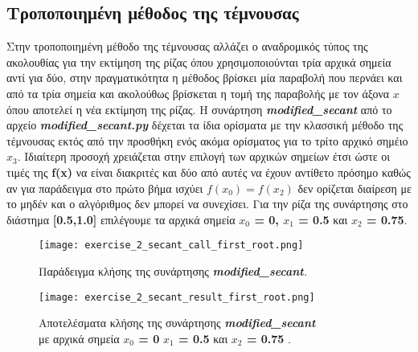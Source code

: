 \documentclass[First Project.tex]{subfiles}
\begin{document}
\subsection{ Τροποποιημένη μέθοδος της τέμνουσας }

Στην τροποποιημένη μέθοδο της τέμνουσας αλλάζει ο αναδρομικός τύπος της ακολουθίας για την εκτίμηση της ρίζας όπου χρησιμοποιούνται τρία
αρχικά σημεία αντί για δύο,  στην πραγματικότητα η μέθοδος βρίσκει μία παραβολή που περνάει και από τα τρία σημεία και ακολούθως βρίσκεται η 
τομή της παραβολής με τον άξονα $x$ όπου αποτελεί η νέα εκτίμηση της ρίζας. Η συνάρτηση 
\textit{\textlatin{\textbf{modified\_secant}}} από το αρχείο \textit{\textlatin{\textbf{modified\_secant.py}}} δέχεται τα ίδια ορίσματα με 
την κλασσική μέθοδο της τέμνουσας εκτός από την προσθήκη ενός ακόμα ορίσματος για το τρίτο αρχικό σημέιο \textlatin{\textbf{$x_{3}$}}. Ιδιαίτερη
προσοχή χρειάζεται στην επιλογή των αρχικών σημείων έτσι ώστε οι τιμές της \textlatin{\textbf{f(x)}} να είναι διακριτές και δύο από αυτές να 
έχουν αντίθετο πρόσημο καθώς αν για παράδειγμα στο πρώτο βήμα ισχύει \textbf{$f(x_{0}) = f(x_{2})$} δεν ορίζεται διαίρεση με το μηδέν και ο 
αλγόριθμος δεν μπορεί να συνεχίσει. Για την ρίζα της συνάρτησης στο διάστημα \textbf{[0.5,1.0]} επιλέγουμε τα αρχικά σημεία 
\textbf{$x_{0}$ = 0, $x_{1}$ = 0.5} και \textbf{$x_{2}$ = 0.75}.
\vspace{5px}
\begin{figure}[h!]
    \centering
    \captionsetup{justification=centering}
    \begin{center}
        \texttt{[image: exercise\_2\_secant\_call\_first\_root.png]}    
        \caption{ Παράδειγμα κλήσης της συνάρτησης \textit{\textlatin{\textbf{modified\_secant}}.}} 
    \end{center}
\end{figure}

\vspace{5px}
\begin{figure}[h!]
    \centering
    \captionsetup{justification=centering}
    \begin{center}
    \texttt{[image: exercise\_2\_secant\_result\_first\_root.png]}    
    \caption{ Αποτελέσματα κλήσης της συνάρτησης \textit{\textlatin{\textbf{modified\_secant}}} \\ με αρχικά σημεία \textbf{\textlatin{$x_{0}$ = 0}} 
                \textbf{\textlatin{$x_{1}$ = 0.5}} και \textbf{\textlatin{$x_{2}$ = 0.75}} . }
    \end{center}
\end{figure}
\end{document}
